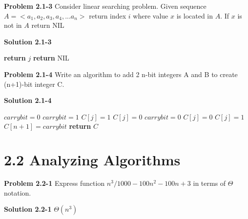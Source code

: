\documentclass{article}
\begin{document}
\hrulefill

\medskip

\textbf{Problem 2.1-3} Consider linear searching problem. Given sequence $A =  <a_1, a_2, a_3, a_4, ... a_n>$ return index $i$ where value $x$ is located in $A$. If $x$ is not in $A$ return NIL

\medskip

\textbf{Solution 2.1-3}

\begin{algorithm}
\begin{algorithmic}[1]
		\State \textbf{return} $j$
	\EndIf
\EndFor
\State \textbf{return} NIL
\EndProcedure
\end{algorithmic}
\end{algorithm}

\hrulefill

\medskip

\textbf{Problem 2.1-4} Write an algorithm to add 2 n-bit integers A and B to create (n+1)-bit integer C.

\medskip

\textbf{Solution 2.1-4}

\begin{algorithm}
\begin{algorithmic}[1]
\State $carrybit = 0$
		$carrybit = 1$
			$C[j] = 1$
		\Else
			$C[j] = 0$
		\EndIf
	\Else
		\State $carrybit = 0$
			$C[j] = 0$
		\Else
			$C[j] = 1$
		\EndIf
	\EndIf
\EndFor
\State $C[n+1] = carrybit$
\State \textbf{return} $C$
\EndProcedure
\end{algorithmic}
\end{algorithm}

\hrulefill

\section*{2.2 Analyzing Algorithms}

\hrulefill

\medskip

\textbf{Problem 2.2-1} Express function $n^{3}/1000 - 100n^{2} - 100n + 3$ in terms of $\Theta$ notation.

\medskip

\textbf{Solution 2.2-1} $\boxed{\Theta(n^3)}$
\end{document}
